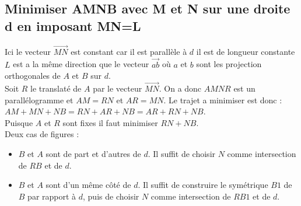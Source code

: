 \documentclass[a4paper,11pt]{book}
\begin{document}
\subsection{Minimiser AMNB avec M et N sur une droite d en imposant MN=L}
Ici le vecteur $\overrightarrow{MN}$ est constant car il est parall\`ele \`a
$d$ il est de longueur constante $L$ est a la m\^eme direction que le vecteur 
$\overrightarrow{ab}$ o\`u $a$ et $b$ sont les projection orthogonales de $A$ 
et $B$ sur $d$.\\
Soit $R$ le translat\'e de $A$ par le vecteur $\overrightarrow{MN}$. On a donc 
$AMNR$ est un parall\'elogramme et $AM=RN$ et $AR=MN$.
Le trajet a minimiser est donc : $AM+MN+NB=RN+AR+NB=AR+RN+NB$.\\
Puisque $A$ et $R$ sont fixes il faut minimiser $RN+NB$.\\
Deux cas de figures :
\begin{itemize}
\item $B$ et $A$ sont de part et d'autres de $d$. Il suffit de choisir $N$ 
comme intersection de $RB$ et de $d$.
\item  $B$ et $A$ sont d'un m\^eme c\^ot\'e de $d$. Il suffit de construire le
sym\'etrique $B1$ de $B$ par rapport \`a $d$, puis de choisir $N$ 
comme intersection de $RB1$ et de $d$.
\end{itemize}
\end{document}
